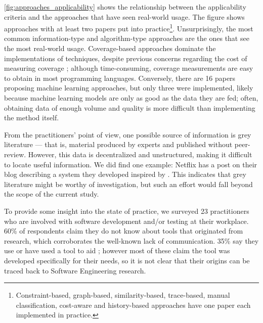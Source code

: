 
\autoref{fig:approaches_applicability} shows the relationship between the applicability criteria and the approaches that have seen real-world usage.
The figure shows approaches with at least two papers put into practice\footnote{Constraint-based, graph-based, similarity-based, trace-based, manual classification, cost-aware and history-based approaches have one paper each implemented in practice.}.
Unsurprisingly, the most common information-type and algorithm-type approaches are the ones that see the most real-world usage.
Coverage-based approaches dominate the implementations of techniques, despite previous concerns regarding the cost of measuring coverage \cite{herzigkeynote}; although time-consuming, coverage measurements are easy to obtain in most programming languages.
Conversely, there are 16 papers proposing machine learning approaches, but only three were implemented, likely because machine learning models are only as good as the data they are fed; often, obtaining data of enough volume and quality is more difficult than implementing the method itself.

From the practitioners' point of view, one possible source of information is grey literature --- that is, material produced by experts and published without peer-review.
However, this data is decentralized and unstructured, making it difficult to locate useful information.
We did find one example: Netflix has a post on their blog \cite{netflixlerner} describing a system they developed inspired by .
This indicates that grey literature might be worthy of investigation, but such an effort would fall beyond the scope of the current study.

To provide some insight into the state of practice, we surveyed 23 practitioners who are involved with software development and/or testing at their workplace.
60\% of respondents claim they do not know about \rt tools that originated from research, which corroborates the well-known lack of communication.
35\% say they use or have used a tool to aid \rt; however most of these claim the tool was developed specifically for their needs, so it is not clear that their origins can be traced back to Software Engineering research.


